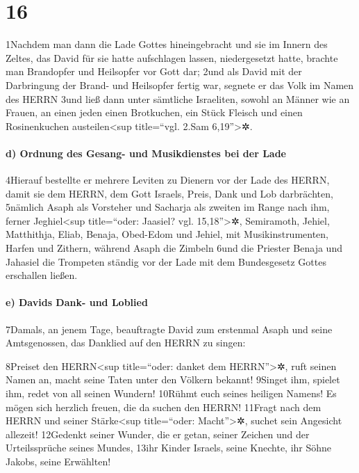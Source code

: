 \hypertarget{section-15}{%
\section{16}\label{section-15}}

1Nachdem man dann die Lade Gottes hineingebracht und sie im Innern des
Zeltes, das David für sie hatte aufschlagen lassen, niedergesetzt hatte,
brachte man Brandopfer und Heilsopfer vor Gott dar; 2und als David mit
der Darbringung der Brand- und Heilsopfer fertig war, segnete er das
Volk im Namen des HERRN 3und ließ dann unter sämtliche Israeliten,
sowohl an Männer wie an Frauen, an einen jeden einen Brotkuchen, ein
Stück Fleisch und einen Rosinenkuchen austeilen\textless sup
title=``vgl. 2.Sam 6,19''\textgreater✲.

\hypertarget{d-ordnung-des-gesang--und-musikdienstes-bei-der-lade}{%
\paragraph{d) Ordnung des Gesang- und Musikdienstes bei der
Lade}\label{d-ordnung-des-gesang--und-musikdienstes-bei-der-lade}}

4Hierauf bestellte er mehrere Leviten zu Dienern vor der Lade des HERRN,
damit sie dem HERRN, dem Gott Israels, Preis, Dank und Lob darbrächten,
5nämlich Asaph als Vorsteher und Sacharja als zweiten im Range nach ihm,
ferner Jeghiel\textless sup title=``oder: Jaasiel? vgl.
15,18''\textgreater✲, Semiramoth, Jehiel, Matthithja, Eliab, Benaja,
Obed-Edom und Jehiel, mit Musikinstrumenten, Harfen und Zithern, während
Asaph die Zimbeln 6und die Priester Benaja und Jahasiel die Trompeten
ständig vor der Lade mit dem Bundesgesetz Gottes erschallen ließen.

\hypertarget{e-davids-dank--und-loblied}{%
\paragraph{e) Davids Dank- und
Loblied}\label{e-davids-dank--und-loblied}}

7Damals, an jenem Tage, beauftragte David zum erstenmal Asaph und seine
Amtsgenossen, das Danklied auf den HERRN zu singen:

8Preiset den HERRN\textless sup title=``oder: danket dem
HERRN''\textgreater✲, ruft seinen Namen an, macht seine Taten unter den
Völkern bekannt! 9Singet ihm, spielet ihm, redet von all seinen Wundern!
10Rühmt euch seines heiligen Namens! Es mögen sich herzlich freuen, die
da suchen den HERRN! 11Fragt nach dem HERRN und seiner
Stärke\textless sup title=``oder: Macht''\textgreater✲, suchet sein
Angesicht allezeit! 12Gedenkt seiner Wunder, die er getan, seiner
Zeichen und der Urteilssprüche seines Mundes, 13ihr Kinder Israels,
seine Knechte, ihr Söhne Jakobs, seine Erwählten!

